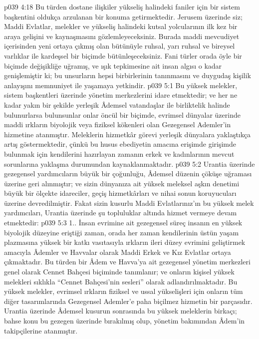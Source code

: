 \vs p039 4:18 Bu türden dostane ilişkiler yükseliş halindeki faniler için bir sistem başkentini oldukça arzulanan bir konuma getirmektedir. Jerusem üzerinde siz; Maddi Evlatlar, melekler ve yükseliş halindeki kutsal yolcularının ilk kez bir araya gelişini ve kaynaşmasını gözlemleyeceksiniz. Burada maddi mevcudiyet içerisinden yeni ortaya çıkmış olan bütünüyle ruhsal, yarı ruhsal ve bireysel varlıklar ile kardeşsel bir biçimde bütünleşeceksiniz. Fani türler orada öyle bir biçimde değişikliğe uğramış, ve ışık tepkimesine ait insan algısı o kadar genişlemiştir ki; bu unsurların hepsi birbirlerinin tanınmasını ve duygudaş kişilik anlayışını memnuniyet ile yaşamaya yetkindir.
\vs p039 5:1 Bu yüksek melekler, sistem başkentleri üzerinde yönetim merkezlerini idare etmektedir; ve her ne kadar yakın bir şekilde yerleşik Âdemsel vatandaşlar ile birliktelik halinde bulunurlarsa bulunsunlar onlar öncül bir biçimde, evrimsel dünyalar üzerinde maddi ırkların biyolojik veya fiziksel kökenleri olan Gezegensel Ademler’in hizmetine atanmıştır. Meleklerin hizmetkâr görevi yerleşik dünyalara yaklaştıkça artış göstermektedir, çünkü bu husus ebediyetin amacına erişimde girişimde bulunmak için kendilerini hazırlayan zamanın erkek ve kadınlarının mevcut sorunlarına yaklaşma durumundan kaynaklanmaktadır.
\vs p039 5:2 Urantia üzerinde gezegensel yardımcıların büyük bir çoğunluğu, Âdemsel düzenin çöküşe uğraması üzerine geri alınmıştır; ve sizin dünyanıza ait yüksek meleksel aşkın denetimi büyük bir ölçekte idareciler, geçiş hizmetkârları ve nihai sonun koruyucuları üzerine devredilmiştir. Fakat sizin kusurlu Maddi Evlatlarınız’ın bu yüksek melek yardımcıları, Urantia üzerinde şu topluluklar altında hizmet vermeye devam etmektedir:
\vs p039 5:3 1.\bibnobreakspace {}. İnsan evrimine ait gezegensel süreç insanın en yüksek biyolojik düzeyine eriştiği zaman, orada her zaman kendilerinin üstün yaşam plazmasına yüksek bir katkı vasıtasıyla ırkların ileri düzey evrimini geliştirmek amacıyla Âdemler ve Havvalar olarak Maddi Erkek ve Kız Evlatlar ortaya çıkmaktadır. Bu türden bir Âdem ve Havva’ya ait gezegensel yönetim merkezleri genel olarak Cennet Bahçesi biçiminde tanımlanır; ve onların kişisel yüksek melekleri sıklıkla “Cennet Bahçesi’nin sesleri” olarak adlandırılmaktadır. Bu yüksek melekler, evrimsel ırkların fiziksel ve ussal yükselişleri için onların tüm diğer tasarımlarında Gezegensel Ademler’e paha biçilmez hizmetin bir parçasıdır. Urantia üzerinde Âdemsel kusurun sonrasında bu yüksek meleklerin birkaçı; bahse konu bu gezegen üzerinde bırakılmış olup, yönetim bakımından Âdem’in takipçilerine atanmıştır.

